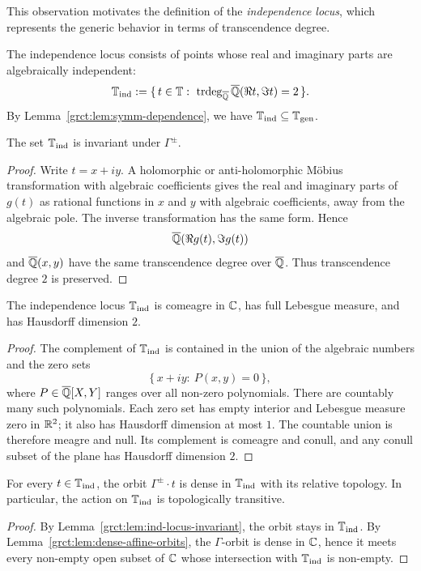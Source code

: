 This observation motivates the definition of the \textit{independence locus}, which represents the generic behavior in terms of transcendence degree.

\begin{definition}\label{grct:def:ind-locus}
	The independence locus consists of points whose real and imaginary parts are algebraically independent:
	\[
		\mathbb{T}_{\mathrm{ind}}:=\{\,t\in\mathbb{T}:\ \operatorname{trdeg}_{\overline{\mathbb{Q}}}\overline{\mathbb{Q}}(\Re t,\Im t)=2\,\}.
	\]
	By Lemma~\ref{grct:lem:symm-dependence}, we have $\mathbb{T}_{\mathrm{ind}}\subseteq\mathbb{T}_{\mathrm{gen}}$.
\end{definition}

\begin{lemma}\label{grct:lem:ind-locus-invariant}
	The set $\mathbb{T}_{\mathrm{ind}}$ is invariant under $\Gamma^{\pm}$.
\end{lemma}
\begin{proof}
	Write $t=x+iy$. A holomorphic or anti-holomorphic Möbius transformation with algebraic coefficients gives the real and imaginary parts of $g(t)$ as rational functions in $x$ and $y$ with algebraic coefficients, away from the algebraic pole. The inverse transformation has the same form. Hence
	\[
		\overline{\mathbb{Q}}(\Re g(t),\Im g(t))
	\]
	and $\overline{\mathbb{Q}}(x,y)$ have the same transcendence degree over $\overline{\mathbb{Q}}$. Thus transcendence degree $2$ is preserved. 
\end{proof}

\begin{proposition}\label{grct:prop:ind-locus-generic}
	The independence locus $\mathbb{T}_{\mathrm{ind}}$ is comeagre in $\mathbb{C}$, has full Lebesgue measure, and has Hausdorff dimension $2$.
\end{proposition}
\begin{proof}
	The complement of $\mathbb{T}_{\mathrm{ind}}$ is contained in the union of the algebraic numbers and the zero sets
	\[
		\{\,x+iy:\ P(x,y)=0\,\},
	\]
	where $P\in\overline{\mathbb{Q}}[X,Y]$ ranges over all non-zero polynomials. There are countably many such polynomials. Each zero set has empty interior and Lebesgue measure zero in $\mathbb{R}^2$; it also has Hausdorff dimension at most $1$. The countable union is therefore meagre and null. Its complement is comeagre and conull, and any conull subset of the plane has Hausdorff dimension $2$.
\end{proof}

\begin{corollary}\label{grct:cor:ind-locus-dense-orbits}
	For every $t\in\mathbb{T}_{\mathrm{ind}}$, the orbit $\Gamma^{\pm}\cdot t$ is dense in $\mathbb{T}_{\mathrm{ind}}$ with its relative topology. In particular, the action on $\mathbb{T}_{\mathrm{ind}}$ is topologically transitive.
\end{corollary}
\begin{proof}
	By Lemma~\ref{grct:lem:ind-locus-invariant}, the orbit stays in $\mathbb{T}_{\mathrm{ind}}$. By Lemma~\ref{grct:lem:dense-affine-orbits}, the $\Gamma$-orbit is dense in $\mathbb{C}$, hence it meets every non-empty open subset of $\mathbb{C}$ whose intersection with $\mathbb{T}_{\mathrm{ind}}$ is non-empty.
\end{proof}

